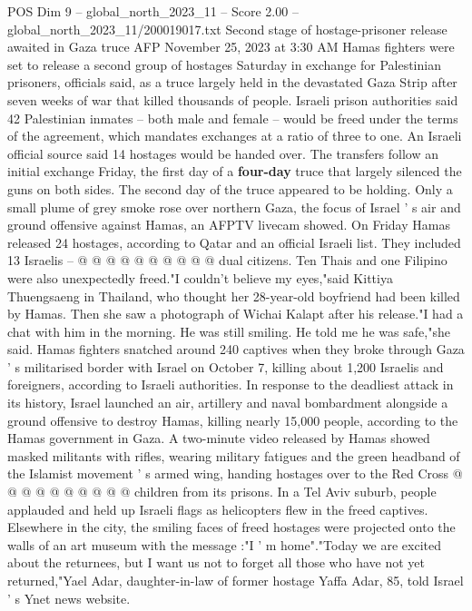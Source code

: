 \begin{textsample}{POS Dim 9 – global\_north\_2023\_11 – Score 2.00 – global\_north\_2023\_11/200019017.txt}  \label{ex:f9_pos_151}
Second stage of hostage-prisoner release awaited in Gaza truce AFP November 25, 2023 at 3:30 AM Hamas fighters were set to release a second group of hostages Saturday in exchange for Palestinian prisoners, officials said, as a truce largely held in the devastated Gaza Strip after seven weeks of war that killed thousands of people.
Israeli prison authorities said 42 Palestinian inmates -- both male and female -- would be freed under the terms of the agreement, which mandates exchanges at a ratio of three to one.
An Israeli official source said 14 hostages would be handed over.
The transfers follow an initial exchange Friday, the first day of a \textbf{four-day} truce that largely silenced the guns on both sides.
The second day of the truce appeared to be holding.
Only a small plume of grey smoke rose over northern Gaza, the focus of Israel ' s air and ground offensive against Hamas, an AFPTV livecam showed.
On Friday Hamas released 24 hostages, according to Qatar and an official Israeli list.
They included 13 Israelis -- @ @ @ @ @ @ @ @ @ @ dual citizens.
Ten Thais and one Filipino were also unexpectedly freed."I couldn't believe my eyes,"said Kittiya Thuengsaeng in Thailand, who thought her 28-year-old boyfriend had been killed by Hamas.
Then she saw a photograph of Wichai Kalapt after his release."I had a chat with him in the morning.
He was still smiling.
He told me he was safe,"she said.
Hamas fighters snatched around 240 captives when they broke through Gaza ' s militarised border with Israel on October 7, killing about 1,200 Israelis and foreigners, according to Israeli authorities.
In response to the deadliest attack in its history, Israel launched an air, artillery and naval bombardment alongside a ground offensive to destroy Hamas, killing nearly 15,000 people, according to the Hamas government in Gaza.
A two-minute video released by Hamas showed masked militants with rifles, wearing military fatigues and the green headband of the Islamist movement ' s armed wing, handing hostages over to the Red Cross @ @ @ @ @ @ @ @ @ @ children from its prisons.
In a Tel Aviv suburb, people applauded and held up Israeli flags as helicopters flew in the freed captives.
Elsewhere in the city, the smiling faces of freed hostages were projected onto the walls of an art museum with the message :"I ' m home"."Today we are excited about the returnees, but I want us not to forget all those who have not yet returned,"Yael Adar, daughter-in-law of former hostage Yaffa Adar, 85, told Israel ' s Ynet news website.

\end{textsample}
